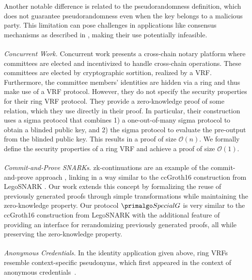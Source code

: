 Another notable difference is related to the pseudorandomness definition, which does not guarantee pseudorandomness even when the key belongs to a malicious party. This limitation can pose challenges in applications like consensus mechanisms as described in \cite{anonymousVRF}, making their use potentially infeasible.
\\\\
\noindent\textit{Concurrent Work.} 
Concurrent work \cite{YinZXLR22} presents a cross-chain notary platform where
committees are elected and incentivized to handle cross-chain operations.
These committees are elected by cryptographic sortition, realized by a VRF.
Furthermore, the committee members' identities are hidden via a ring and thus make use of a VRF protocol.
However, they do not specify the security properties for their ring VRF protocol.
They provide a zero-knowledge proof of some relation, which they use directly in their proof.
In particular, their construction uses a sigma protocol that combines 1) a one-out-of-many sigma protocol  to obtain a blinded public key, and 2) the sigma protocol to evaluate the pre-output from the blinded public key. This results in a proof of size $\mathcal{O}(n)$.
We formally define the security properties of a ring VRF and achieve a proof of size $\mathcal{O}(1)$.
\\\\
\noindent\textit{Commit-and-Prove SNARKs.} zk-continuations are an example of the commit-and-prove approach \cite{LegoSNARK}, linking  in a way similar to the ccGroth16 construction from LegoSNARK \cite{LegoSNARK}. Our work extends this concept by formalizing the reuse of previously generated proofs through simple transformations while maintaining the zero-knowledge property. Our protocol $ \SpecialG $ is very similar to the ccGroth16 construction from LegoSNARK \cite{LegoSNARK} with the additional feature of providing an interface for rerandomizing previously generated proofs, all while preserving the zero-knowledge property. 
\\\\
 \emph{Anonymous Credentials.} In the identity application given above, ring VRFs resemble context-specific pseudonyms, which first appeared in the context of anonymous credentials~\cite{DBLP:journals/cacm/Chaum85,DBLP:conf/crypto/ChaumE86,EC:CamLys01}. 

